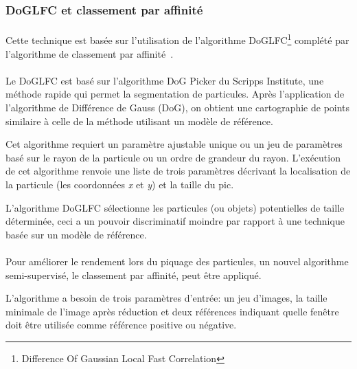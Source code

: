 \subsubsection{DoGLFC et classement par affinité}

\paragraph*{}
Cette technique est basée sur l'utilisation de l'algorithme DoGLFC\footnote{Difference Of Gaussian Local Fast Correlation} complété par l'algorithme de classement par affinité~\cite{DoGAff:article}.

\paragraph*{}
Le DoGLFC est basé sur l'algorithme DoG Picker du Scripps Institute\cite{Scripps:url}, une méthode rapide qui permet la segmentation de particules. Après l'application de l'algorithme de Différence de Gauss (DoG), on obtient une cartographie de points similaire à celle de la méthode utilisant un modèle de référence.%

\noindent
Cet algorithme requiert un paramètre ajustable unique ou un jeu de paramètres basé sur le rayon de la particule ou un ordre de grandeur du rayon. L'exécution de cet algorithme renvoie une liste de trois paramètres décrivant la localisation de la particule (les coordonnées \emph{x} et \emph{y}) et la taille du pic.%

\noindent
L'algorithme DoGLFC sélectionne les particules (ou objets) potentielles de taille déterminée, ceci a un pouvoir discriminatif moindre par rapport à une technique basée sur un modèle de référence.

\paragraph*{}
Pour améliorer le rendement lors du piquage des particules, un nouvel algorithme semi-supervisé, le classement par affinité, peut \^etre appliqué.

\noindent
L’algorithme a besoin de trois paramètres d'entrée: un jeu d'images, la taille minimale de l'image après réduction et deux références indiquant quelle fen\^etre doit \^etre utilisée comme référence positive ou négative.

